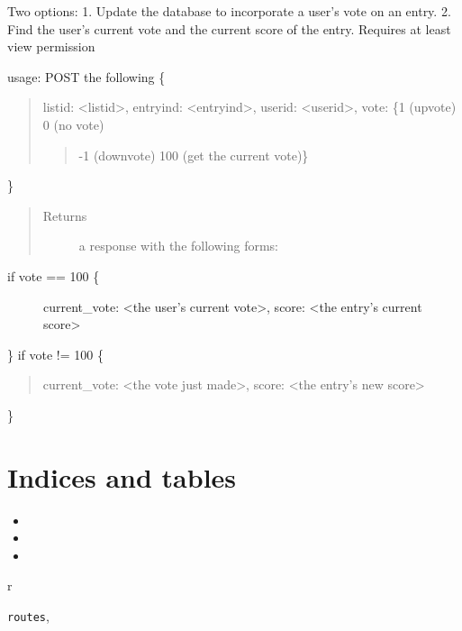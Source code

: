 \documentclass[letterpaper,10pt,english]{sphinxmanual}
\begin{document}

\begin{fulllineitems}
\label{index:routes.vote}
Two options:
1. Update the database to incorporate a user's vote on an entry.
2. Find the user's current vote and the current score of the entry.
Requires at least view permission

usage: POST the following
\{
\begin{quote}

listid: \textless{}listid\textgreater{},
entryind: \textless{}entryind\textgreater{},
userid: \textless{}userid\textgreater{},
vote: \{1 (upvote) \textbar{} 0 (no vote) \textbar{}
\begin{quote}

-1 (downvote) \textbar{} 100 (get the current vote)\}
\end{quote}
\end{quote}

\}
\begin{quote}\begin{description}
\item[{Returns}] \leavevmode
a response with the following forms:

\end{description}\end{quote}
\begin{description}
\item[{if vote == 100 \{}] \leavevmode
current\_vote: \textless{}the user's current vote\textgreater{},
score: \textless{}the entry's current score\textgreater{}

\end{description}

\}
if vote != 100 \{
\begin{quote}

current\_vote: \textless{}the vote just made\textgreater{},
score: \textless{}the entry's new score\textgreater{}
\end{quote}

\}

\end{fulllineitems}



\chapter{Indices and tables}
\label{index:welcome-to-catalist-s-documentation}\label{index:indices-and-tables}\begin{itemize}
\item {} 

\item {} 

\item {} 

\end{itemize}


\renewcommand{\indexname}{Python Module Index}
\begin{theindex}
\def\bigletter#1{{\Large\sffamily#1}\nopagebreak\vspace{1mm}}
\bigletter{r}
\item {\texttt{routes}}, \pageref{index:module-routes}
\end{theindex}

\renewcommand{\indexname}{Index}
\printindex
\end{document}

